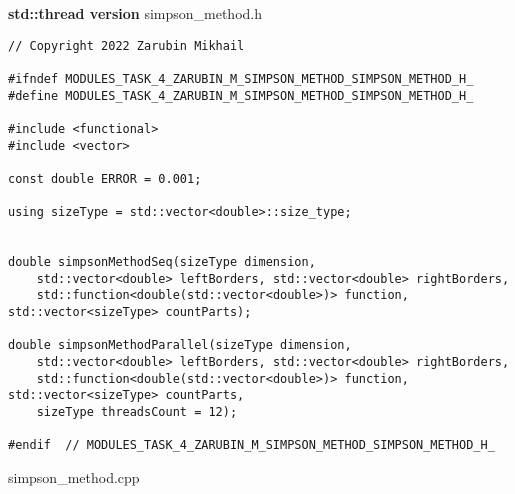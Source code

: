 \documentclass{report}
\begin{document}
\textbf{std::thread version}
\newline
\newline simpson\_method.h
\begin{lstlisting}
// Copyright 2022 Zarubin Mikhail

#ifndef MODULES_TASK_4_ZARUBIN_M_SIMPSON_METHOD_SIMPSON_METHOD_H_
#define MODULES_TASK_4_ZARUBIN_M_SIMPSON_METHOD_SIMPSON_METHOD_H_

#include <functional>
#include <vector>

const double ERROR = 0.001;

using sizeType = std::vector<double>::size_type;


double simpsonMethodSeq(sizeType dimension,
    std::vector<double> leftBorders, std::vector<double> rightBorders,
    std::function<double(std::vector<double>)> function, std::vector<sizeType> countParts);

double simpsonMethodParallel(sizeType dimension,
    std::vector<double> leftBorders, std::vector<double> rightBorders,
    std::function<double(std::vector<double>)> function, std::vector<sizeType> countParts,
    sizeType threadsCount = 12);

#endif  // MODULES_TASK_4_ZARUBIN_M_SIMPSON_METHOD_SIMPSON_METHOD_H_

\end{lstlisting}
simpson\_method.cpp
\end{document}
